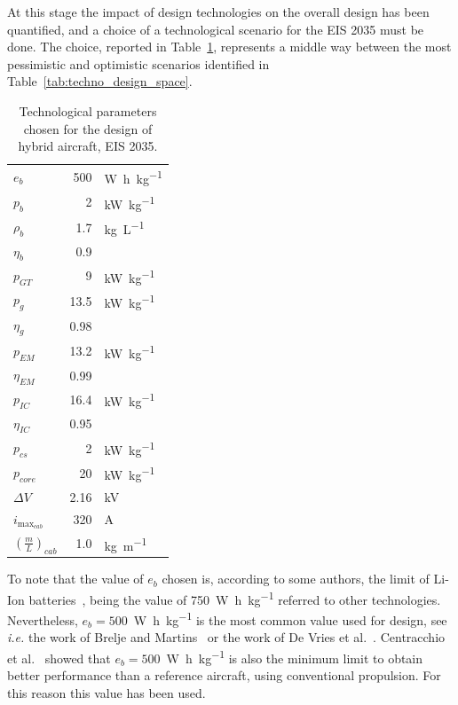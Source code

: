 At this stage the impact of design technologies on the overall design has been quantified, and a choice of a technological scenario for the EIS 2035 must be done. 
The choice, reported in Table~\ref{tab:techno_design_parameters}, represents a middle way between the most pessimistic and optimistic scenarios identified in Table~\ref{tab:techno_design_space}. 
\begin{table}[!h]
	\centering
	\begin{tabular}{l r l}
		\hline
		$e_b$ & 500 & \si{\watt\hour\per\kilogram} \\
		$p_b$ & 2 & \si{\kilo\watt\per\kilogram} \\
		$\rho_b$ & 1.7 & \si{\kilogram\per\liter} \\
		$\eta_b$ & 0.9 & \\
		
		$p_{GT}$ & 9 & \si{\kilo\watt\per\kilogram} \\
		$p_g$ & 13.5 & \si{\kilo\watt\per\kilogram} \\
		$\eta_g$ & 0.98 & \\
		
		$p_{EM}$ & 13.2 & \si{\kilo\watt\per\kilogram}\\
		$\eta_{EM}$ & 0.99 & \\
		
		$p_{IC}$ & 16.4 & \si{\kilo\watt\per\kilogram} \\
		$\eta_{IC}$ & 0.95 & \\
		
		$p_{cs}$ & 2 & \si{\kilo\watt\per\kilogram} \\
		
		$p_{core}$ & 20 & \si{\kilo\watt\per\kilogram} \\
		
		$\Delta V$ & 2.16 & \si{\kilo\volt} \\
		$i_{\max_{cab}}$ & 320 & \si{\ampere} \\
		$\left(\frac{m}{L}\right)_{cab}$ & 1.0 & \si{\kilogram\per\meter} \\		
		\hline
	\end{tabular}
	\caption{Technological parameters chosen for the design of hybrid aircraft, EIS 2035.}
	\label{tab:techno_design_parameters}
\end{table}  
To note that the value of $e_b$ chosen is, according to some authors, the limit of Li-Ion batteries~\cite{bib:fraunhofer, bib:dever}, being the value of 750~\si{\watt\hour\per\kilogram} referred to other technologies.
Nevertheless, $e_b=500$~\si{\watt\hour\per\kilogram} is the most common value used for design, see \textit{i.e.} the work of Brelje and Martins~\cite{bib:brelje_model} or the work of De Vries et al.~\cite{bib:devries}. 
Centracchio et al.~\cite{bib:centracchio} showed that $e_b=500$~\si{\watt\hour\per\kilogram} is also the minimum limit to obtain better performance than a reference aircraft, using conventional propulsion. 
For this reason this value has been used. 

